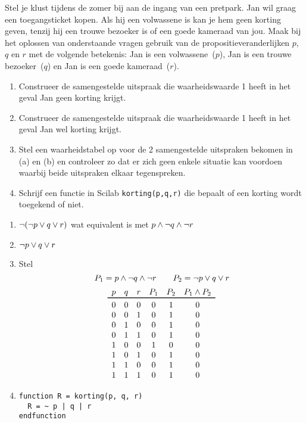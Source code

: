 \begin{oef}
Stel je klust tijdens de zomer bij aan de ingang van een pretpark. Jan wil graag een toegangsticket kopen. Als hij een volwassene is kan je hem geen korting geven, tenzij hij een trouwe bezoeker is of een goede kameraad van jou. Maak bij het oplossen van onderstaande vragen gebruik van de propositieveranderlijken $p$, $q$ en $r$ met de volgende betekenis: Jan is een volwassene~($p$), Jan is een trouwe bezoeker~($q$) en Jan is een goede kameraad~($r$).
\begin{enumerate}
  \item Construeer de samengestelde uitspraak die waarheidswaarde 1 heeft in het geval Jan geen korting krijgt.
  \item Construeer de samengestelde uitspraak die waarheidswaarde 1 heeft in het geval Jan wel korting krijgt.
  \item Stel een waarheidstabel op voor de 2 samengestelde uitspraken bekomen in (a) en (b) en controleer zo dat er zich geen enkele situatie kan voordoen waarbij beide uitspraken elkaar tegenspreken.
  \item Schrijf een functie in Scilab \verb+korting(p,q,r)+ die bepaalt of een korting wordt toegekend of niet.
\end{enumerate}
\begin{opl}
\begin{enumerate}
  \item $\neg(\neg p \vee q \vee r)$ wat equivalent is met $p \wedge \neg q \wedge \neg r$
  \item $\neg p \vee q \vee r$
  \item Stel
        \[ P_1 = p \wedge \neg q \wedge \neg r \qquad P_2 = \neg p \vee q \vee r \]
        \[
          \begin{array}{cccccccc}
            p & q & r & P_1 & P_2 & P_1 \en P_2 \\
            \toprule
            0 & 0 & 0 & 0 & 1 & 0 \\
            0 & 0 & 1 & 0 & 1 & 0 \\
            0 & 1 & 0 & 0 & 1 & 0 \\
            0 & 1 & 1 & 0 & 1 & 0 \\
            1 & 0 & 0 & 1 & 0 & 0 \\
            1 & 0 & 1 & 0 & 1 & 0 \\
            1 & 1 & 0 & 0 & 1 & 0 \\
            1 & 1 & 1 & 0 & 1 & 0 \\            
          \end{array}
        \]
  \item \begin{lstlisting}
function R = korting(p, q, r)
  R = ~ p | q | r
endfunction
        \end{lstlisting}
\end{enumerate}
\end{opl}
\end{oef}

